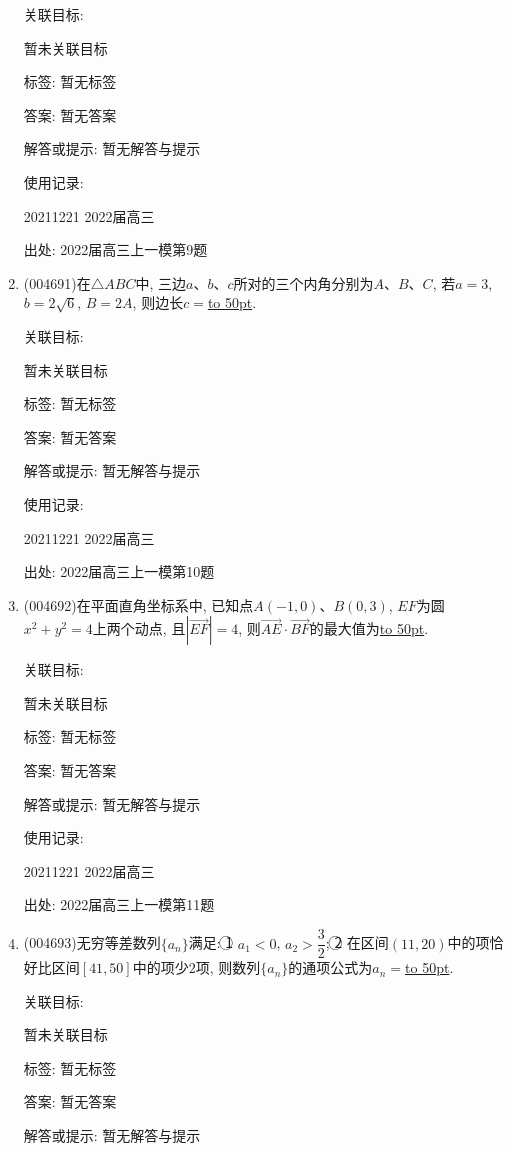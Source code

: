 \documentclass[10pt,a4paper]{article}
\newcommand{\blank}[1]{\underline{\hbox to #1pt{}}}
\begin{document}
\begin{enumerate}[1.]
关联目标:

暂未关联目标



标签: 暂无标签

答案: 暂无答案

解答或提示: 暂无解答与提示

使用记录:

20211221	2022届高三	


出处: 2022届高三上一模第9题
\item { (004691)}在$\triangle ABC$中, 三边$a$、$b$、$c$所对的三个内角分别为$A$、$B$、$C$, 若$a=3$, $b=2\sqrt 6$, $B=2A$, 则边长$c=$\blank{50}.


关联目标:

暂未关联目标



标签: 暂无标签

答案: 暂无答案

解答或提示: 暂无解答与提示

使用记录:

20211221	2022届高三	


出处: 2022届高三上一模第10题
\item { (004692)}在平面直角坐标系中, 已知点$A(-1,0)$、$B(0,3)$, $EF$为圆$x^2+y^2=4$上两个动点, 且$|\overrightarrow{EF}|=4$, 则$\overrightarrow{AE}\cdot \overrightarrow{BF}$的最大值为\blank{50}.


关联目标:

暂未关联目标



标签: 暂无标签

答案: 暂无答案

解答或提示: 暂无解答与提示

使用记录:

20211221	2022届高三	


出处: 2022届高三上一模第11题
\item { (004693)}无穷等差数列$\{a_n\}$满足: \textcircled{1} $a_1<0$, $a_2>\dfrac 32$; \textcircled{2} 在区间$(11,20)$中的项恰好比区间$[41,50]$中的项少$2$项, 则数列$\{a_n\}$的通项公式为$a_n=$\blank{50}.


关联目标:

暂未关联目标



标签: 暂无标签

答案: 暂无答案

解答或提示: 暂无解答与提示


\end{enumerate}
\end{document}

